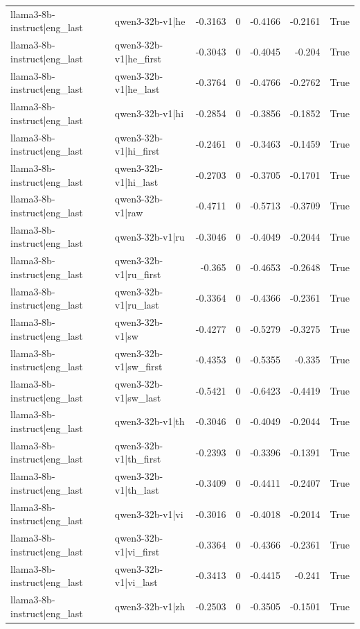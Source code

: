 \begin{table}
\begin{tabular}{l l r r r r l}
llama3-8b-instruct|eng_last & qwen3-32b-v1|he & -0.3163 & 0 & -0.4166 & -0.2161 & True \\
llama3-8b-instruct|eng_last & qwen3-32b-v1|he_first & -0.3043 & 0 & -0.4045 & -0.204 & True \\
llama3-8b-instruct|eng_last & qwen3-32b-v1|he_last & -0.3764 & 0 & -0.4766 & -0.2762 & True \\
llama3-8b-instruct|eng_last & qwen3-32b-v1|hi & -0.2854 & 0 & -0.3856 & -0.1852 & True \\
llama3-8b-instruct|eng_last & qwen3-32b-v1|hi_first & -0.2461 & 0 & -0.3463 & -0.1459 & True \\
llama3-8b-instruct|eng_last & qwen3-32b-v1|hi_last & -0.2703 & 0 & -0.3705 & -0.1701 & True \\
llama3-8b-instruct|eng_last & qwen3-32b-v1|raw & -0.4711 & 0 & -0.5713 & -0.3709 & True \\
llama3-8b-instruct|eng_last & qwen3-32b-v1|ru & -0.3046 & 0 & -0.4049 & -0.2044 & True \\
llama3-8b-instruct|eng_last & qwen3-32b-v1|ru_first & -0.365 & 0 & -0.4653 & -0.2648 & True \\
llama3-8b-instruct|eng_last & qwen3-32b-v1|ru_last & -0.3364 & 0 & -0.4366 & -0.2361 & True \\
llama3-8b-instruct|eng_last & qwen3-32b-v1|sw & -0.4277 & 0 & -0.5279 & -0.3275 & True \\
llama3-8b-instruct|eng_last & qwen3-32b-v1|sw_first & -0.4353 & 0 & -0.5355 & -0.335 & True \\
llama3-8b-instruct|eng_last & qwen3-32b-v1|sw_last & -0.5421 & 0 & -0.6423 & -0.4419 & True \\
llama3-8b-instruct|eng_last & qwen3-32b-v1|th & -0.3046 & 0 & -0.4049 & -0.2044 & True \\
llama3-8b-instruct|eng_last & qwen3-32b-v1|th_first & -0.2393 & 0 & -0.3396 & -0.1391 & True \\
llama3-8b-instruct|eng_last & qwen3-32b-v1|th_last & -0.3409 & 0 & -0.4411 & -0.2407 & True \\
llama3-8b-instruct|eng_last & qwen3-32b-v1|vi & -0.3016 & 0 & -0.4018 & -0.2014 & True \\
llama3-8b-instruct|eng_last & qwen3-32b-v1|vi_first & -0.3364 & 0 & -0.4366 & -0.2361 & True \\
llama3-8b-instruct|eng_last & qwen3-32b-v1|vi_last & -0.3413 & 0 & -0.4415 & -0.241 & True \\
llama3-8b-instruct|eng_last & qwen3-32b-v1|zh & -0.2503 & 0 & -0.3505 & -0.1501 & True \\

\end{tabular}
\end{table}
